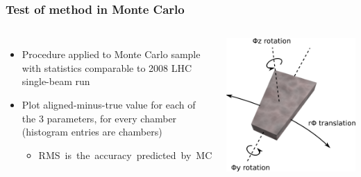 \documentclass[compress]{beamer}
\begin{document}
\begin{frame}
\frametitle{Test of method in Monte Carlo}

\begin{columns}
\begin{itemize}
\item Procedure applied to Monte Carlo sample with statistics comparable to 2008 LHC single-beam run
\item Plot aligned-minus-true value for each of the 3 parameters, for every chamber (histogram entries are chambers)
\begin{itemize}
\item \mbox{RMS is the accuracy predicted by MC\hspace{-1 cm}}
\end{itemize}
\end{itemize}

\includegraphics[width=\linewidth]{csc_coordinates.pdf}
\end{columns}


\end{frame}
\end{document}
